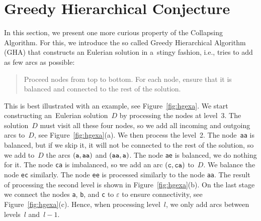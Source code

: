 \clearpage
\section{Greedy Hierarchical Conjecture}
\label{sec:greedy_hier}
In this section, we present one more curious property of the Collapsing Algorithm. For this, we introduce the so called Greedy Hierarchical Algorithm (GHA) that constructs an Eulerian solution in a~stingy fashion, i.e., tries to add as few arcs as possible:
\begin{quote}
Proceed nodes from top to bottom. For each node, ensure that it is balanced and connected to the rest of the solution.
\end{quote}
This is best illustrated with an example, see Figure~\ref{fig:hgexa}. We start constructing an~Eulerian solution~$D$ by processing the nodes at level~$3$. The solution~$D$ must visit all these four nodes, so we add all incoming and outgoing arcs to~$D$, see Figure~\ref{fig:hgexa}(a). We then process the level~2. The node~{\tt aa} is balanced, but if we skip it, it will not be connected to the rest of the solution, so we add to~$D$ the arcs $({\tt a}, {\tt aa})$ and $({\tt aa}, {\tt a})$. The node {\tt ae} is balanced, we do nothing for it. The node {\tt ca} is imbalanced, so we add an arc $({\tt c}, {\tt ca})$ to~$D$. We balance the node {\tt ec} similarly. The node {\tt ee} is processed similarly to the node {\tt aa}. The result of processing the second level is shown in Figure~\ref{fig:hgexa}(b). On the last stage we connect the nodes {\tt a}, {\tt b}, and {\tt c} to $\varepsilon$ to ensure connectivity, see Figure~\ref{fig:hgexa}(c). Hence, when processing level~$l$, we only add arcs between levels~$l$ and~$l-1$.


